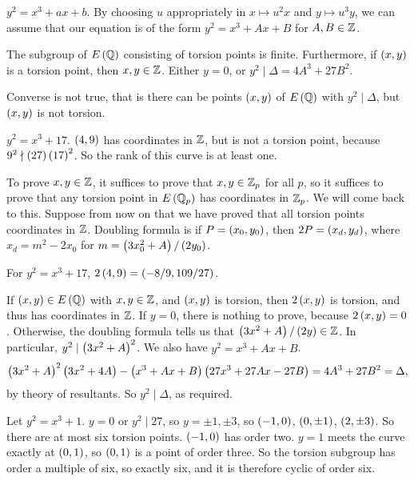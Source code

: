 $ y^2 = x^3 + ax + b $. By choosing $ u $ appropriately in $ x \mapsto u^2x $ and $ y \mapsto u^3y $, we can assume that our equation is of the form $ y^2 = x^3 + Ax + B $ for $ A, B \in \mathbb{Z} $.

\begin{theorem}
The subgroup of $ E\left( \mathbb{Q} \right) $ consisting of torsion points is finite. Furthermore, if $ \left( x, y \right) $ is a torsion point, then $ x, y \in \mathbb{Z} $. Either $ y = 0 $, or $ y^2 \mid \Delta = 4A^3 + 27B^2 $.
\end{theorem}

\begin{note*}
Converse is not true, that is there can be points $ \left( x, y \right) $ of $ E\left( \mathbb{Q} \right) $ with $ y^2 \mid \Delta $, but $ \left( x, y \right) $ is not torsion.
\end{note*}

\begin{example*}
$ y^2 = x^3 + 17 $. $ \left( 4, 9 \right) $ has coordinates in $ \mathbb{Z} $, but is not a torsion point, because $ 9^2 \nmid \left( 27 \right)\left( 17 \right)^2 $. So the rank of this curve is at least one.
\end{example*}

To prove $ x, y \in \mathbb{Z} $, it suffices to prove that $ x, y \in \mathbb{Z}_p $ for all $ p $, so it suffices to prove that any torsion point in $ E\left( \mathbb{Q}_p \right) $ has coordinates in $ \mathbb{Z}_p $. We will come back to this. Suppose from now on that we have proved that all torsion points coordinates in $ \mathbb{Z} $. Doubling formula is if $ P = \left( x_0, y_0 \right) $, then $ 2P = \left( x_d, y_d \right) $, where $ x_d = m^2 - 2x_0 $ for $ m = \left( 3x_0^2 + A \right) / \left( 2y_0 \right) $.

\begin{example*}
For $ y^2 = x^3 + 17 $, $ 2\left( 4, 9 \right) = \left( -8 / 9, 109 / 27 \right) $.
\end{example*}

If $ \left( x, y \right) \in E\left( \mathbb{Q} \right) $ with $ x, y \in \mathbb{Z} $, and $ \left( x, y \right) $ is torsion, then $ 2\left( x, y \right) $ is torsion, and thus has coordinates in $ \mathbb{Z} $. If $ y = 0 $, there is nothing to prove, because $ 2\left( x, y \right) = 0 $. Otherwise, the doubling formula tells us that $ \left( 3x^2 + A \right) / \left( 2y \right) \in \mathbb{Z} $. In particular, $ y^2 \mid \left( 3x^2 + A \right)^2 $. We also have $ y^2 = x^3 + Ax + B $.
$$ \left( 3x^2 + A \right)^2\left( 3x^2 + 4A \right) - \left( x^3 + Ax + B \right)\left( 27x^3 + 27Ax - 27B \right) = 4A^3 + 27B^2 = \Delta, $$
by theory of resultants. So $ y^2 \mid \Delta $, as required.

\begin{example*}
Let $ y^2 = x^3 + 1 $. $ y = 0 $ or $ y^2 \mid 27 $, so $ y = \pm 1, \pm 3 $, so $ \left( -1, 0 \right) $, $ \left( 0, \pm 1 \right) $, $ \left( 2, \pm 3 \right) $. So there are at most six torsion points. $ \left( -1, 0 \right) $ has order two. $ y = 1 $ meets the curve exactly at $ \left( 0, 1 \right) $, so $ \left( 0, 1 \right) $ is a point of order three. So the torsion subgroup has order a multiple of six, so exactly six, and it is therefore cyclic of order six.
\end{example*}

